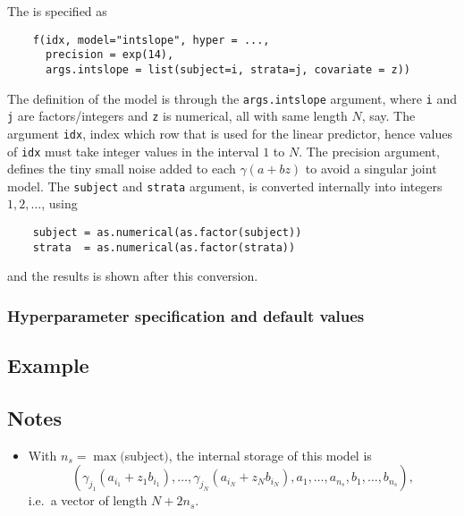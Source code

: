 \documentclass[a4paper,11pt]{article}
\begin{document}
The is specified as
\begin{verbatim}
    f(idx, model="intslope", hyper = ...,
      precision = exp(14),
      args.intslope = list(subject=i, strata=j, covariate = z))
\end{verbatim}
The definition of the model is through the \verb|args.intslope|
argument, where \verb|i| and \verb|j| are factors/integers and
\verb|z| is numerical, all with same length $N$, say. The argument
\verb|idx|, index which row that is used for the linear predictor,
hence values of \verb|idx| must take integer values in the interval
$1$ to $N$. The precision argument, defines the tiny small noise added
to each $\gamma(a+bz)$ to avoid a singular joint model. The
\verb|subject| and \verb|strata| argument, is converted internally
into integers $1, 2, \ldots$, using
\begin{verbatim}
    subject = as.numerical(as.factor(subject))
    strata  = as.numerical(as.factor(strata))
\end{verbatim}
and the results is shown after this conversion.


\subsubsection*{Hyperparameter specification and default values}
{\small

}

\clearpage
\subsection*{Example}
{\small}

\subsection*{Notes}
\begin{itemize}
\item With $n_s=\max($subject$)$, the internal storage of this model
    is
    \begin{displaymath}
        \left(\gamma_{j_1} (a_{i_1} + z_{1}b_{i_{1}}), \ldots, 
        \gamma_{j_N} (a_{i_N} + z_{N}b_{i_N}), 
        a_1, \ldots, a_{n_s}, b_1, \ldots, b_{n_s}\right),
    \end{displaymath}
    i.e.\ a vector of length $N+2n_s$.
\end{itemize}
\end{document}
